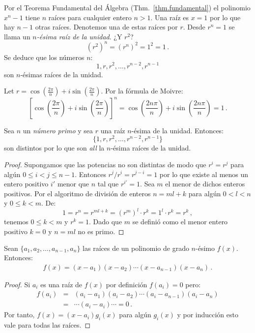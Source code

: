 Por el Teorema Fundamental del Álgebra (Thm.~\ref{thm.fundamental}) el polinomio $x^{n}-1$ tiene $n$ raíces para cualquier entero $n> 1$. Una raíz es $x=1$ por lo que hay $n-1$ otras raíces. Denotemos una de estas raíces por $r$. Desde $r^{n}=1$ se llama un \emph{$n$-ésima raíz de la unidad}. ¿Y $r^2$?
\[
(r^{2})^n=(r^{n})^2=1^2=1\,.
\]
Se deduce que los números $n$:
\[
1, r, r^2, \ldots, r^{n-2}, r^{n-1}
\]
son $n$-ésimas raíces de la unidad.

\begin{advanced}
Let $r=\cos \left(\frac{2\pi}{n}\right) + i\sin  \left(\frac{2\pi}{n}\right)$.
Por la fórmula de Moivre:
\[
\left[\cos \left(\frac{2\pi}{n}\right) + i\sin  \left(\frac{2\pi}{n}\right)\right]^{n}=
\cos \left(\frac{2 n\pi}{n}\right) + i\sin  \left(\frac{2 n\pi}{n}\right)= 1\,.
\]
\end{advanced}

\begin{theorem}
Sea $n$ un \emph{número primo} y sea $r$ una raíz $n$-ésima de la unidad. Entonces:
\[
\{1,r,r^2,\ldots,r^{n-2},r^{n-1}\}
\]
son distintos por lo que son \emph{all} la $n$-ésima raíces de la unidad.
\end{theorem}

\begin{proof}
Supongamos que las potencias no son distintas de modo que $r^i=r^j$ para algún $0\leq i<j\leq n-1$. Entonces $r^j/r^i=r^{j-i}=1$ por lo que existe al menos un entero positivo $i'$ menor que $n$ tal que $r^{i'}=1$. Sea $m$ el menor de dichos enteros positivos. Por el algoritmo de división de enteros $n=ml+k$ para algún $0<l<n$ y $0\leq k<m$. De:
\[
1=r^n=r^{ml+k}=(r^m)^l\cdot r^k=1^l\cdot r^k=r^k\,,
\]
tenemos $0\leq k<m$ y $r^k=1$. Dado que $m$ se definió como el menor entero positivo $k=0$ y $n=ml$ no es primo.
\end{proof}

\begin{theorem} Sean $\{a_1,a_2,\ldots,a_{n-1},a_n\}$ las raíces de un polinomio de grado $n$-ésimo $f(x)$. Entonces:
\begin{align}\label{eq.viete}
f(x) =(x-a_1) (x-a_2)\cdots (x-a_{n-1})(x-a_n)\,.
\end{align}
\end{theorem}

\begin{proof}
Si $a_i$ es una raíz de $f(x)$ por definición $f(a_i)=0$ pero:
\begin{eqnarray*}
f(a_i)&=&(a_i-a_1) (a_i-a_2)\cdots (a_i-a_{n-1})(a_i-a_n)\\
&=&\cdots (a_i-a_i) \cdots =0\,.
\end{eqnarray*}
Por tanto, $f(x)=(x-a_i)g_i(x)$ para algún $g_i(x)$ y por inducción esto vale para todas las raíces.
\end{proof}

